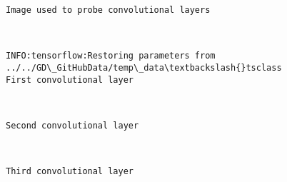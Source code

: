 \documentclass[11pt]{article}
\begin{document}
    \begin{Verbatim}[commandchars=\\\{\}]
Image used to probe convolutional layers

    \end{Verbatim}

    \begin{center}
    \end{center}
    { \hspace*{\fill} \\}
    
    \begin{Verbatim}[commandchars=\\\{\}]
INFO:tensorflow:Restoring parameters from ../../GD\_GitHubData/temp\_data\textbackslash{}tsclass
First convolutional layer

    \end{Verbatim}

    \begin{center}
    \end{center}
    { \hspace*{\fill} \\}
    
    \begin{Verbatim}[commandchars=\\\{\}]
Second convolutional layer

    \end{Verbatim}

    \begin{center}
    \end{center}
    { \hspace*{\fill} \\}
    
    \begin{Verbatim}[commandchars=\\\{\}]
Third convolutional layer

    \end{Verbatim}

    \begin{center}
    \end{center}
    { \hspace*{\fill} \\}
    
\end{document}
